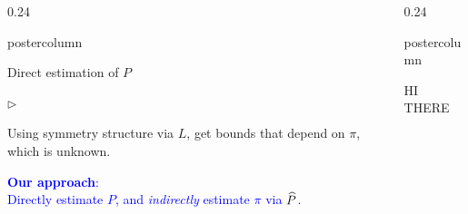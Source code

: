 \documentclass[notheorems,final]{beamer}
\newlength{\columnheight}
\newcommand{\BLUE}[1]{\textcolor{blue}{#1}}
\begin{document}
\begin{frame}{}
\begin{columns}
\begin{column}{0.24\textwidth}
\begin{beamercolorbox}[center,wd=\textwidth]{postercolumn}
\begin{minipage}[T]{.95\textwidth}
{\begin{block}{Direct estimation of $P$}
\begin{list}{$\triangleright$}
                  \item
                    Using symmetry structure via $L$, get bounds that
                    depend on $\pi$, which is unknown.

                \end{list}

                \begin{center}
                  \BLUE{%
                    \textbf{Our approach}: \\
                    Directly estimate $P$, and \emph{indirectly} estimate $\pi$ via
                    $\widehat P$.
                  }
                \end{center}


              \end{block}
            }
          \end{minipage}
        \end{beamercolorbox}
      \end{column}
      \begin{column}{0.24\textwidth}
        \begin{beamercolorbox}[center,wd=\textwidth]{postercolumn}
          \begin{minipage}[T]{.95\textwidth}
            \parbox[t][\columnheight]{\textwidth}{
              \begin{block}{HI THERE}
              \end{block}
            }
          \end{minipage}
        \end{beamercolorbox}
      \end{column}
    \end{columns}

    \vfill
  \end{frame}
\end{document}
